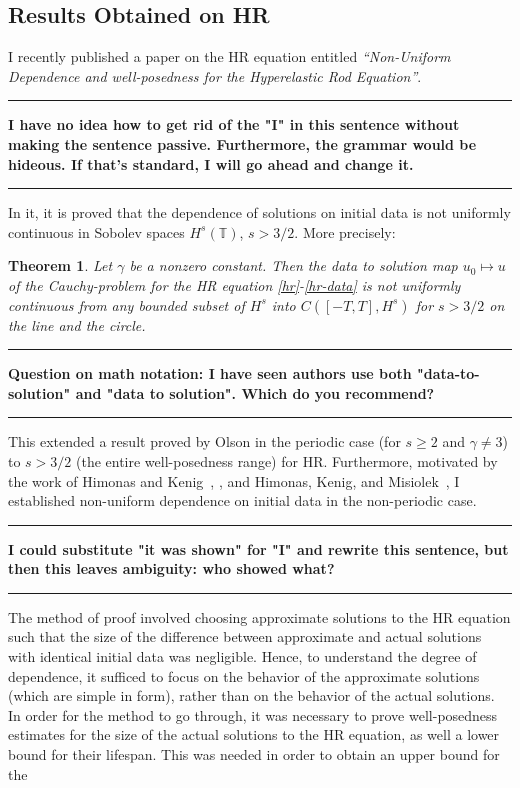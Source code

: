 \documentclass[12pt,reqno]{amsart}
\newcommand{\ci}{\mathbb{T}}
\newtheorem{theorem}{Theorem}
\begin{document}
\subsection{Results Obtained on HR} 
\label{ssec:weak-disp}
%
%
%
%
%
%
%
%
%
%
I recently published a paper on the HR equation entitled 
{\it ``Non-Uniform Dependence and well-posedness
for the
Hyperelastic Rod Equation''}. 
\hrule
\textbf{I have no idea how to get rid of the "I" in this sentence without making the sentence passive. Furthermore, the grammar would be hideous.
    If that's standard, I will go ahead and change it.}
\hrule
In it, it is proved that the dependence of
solutions on initial data is not uniformly continuous in Sobolev spaces
$H^s(\ci)$, $s>3/2$.  More precisely: 
\begin{theorem}
\label{hr-non-unif-dependence}
Let $\gamma$ be a nonzero constant. Then 
the data to solution map $u_{0} \mapsto u$ of the Cauchy-problem
for the HR equation
\eqref{hr}-\eqref{hr-data}
is not uniformly continuous
from any bounded subset of  $H^s$ into $C([-T, T], H^s)$
for $s>3/2$ on the line and the circle.
%
\end{theorem}
\hrule
\textbf{Question on math notation: I have seen authors use both "data-to-solution" and "data to solution". Which do you recommend?}
\hrule
This extended a result proved by Olson 
\cite{Olson_2006_Non-uniform-dep} in the periodic
case (for $s\ge 2$ and $\gamma \ne 3$)  to  $s>3/2$ (the entire well-posedness
range) for HR\@. Furthermore, motivated by the work of Himonas and
Kenig~\cite{Himonas:2009fk}, \cite{Himonas:2009fk}, and 
Himonas, Kenig, and Misiolek~\cite{Himonas_2009_Non-uniform-dep-per},
I established non-uniform dependence on initial data in the non-periodic case.
\hrule
\textbf{I could substitute "it was shown" for "I" and rewrite this sentence, but then this leaves ambiguity: who showed what?}
\hrule
The method of proof involved choosing approximate solutions to the HR equation
such that the size of the difference between approximate and actual solutions
with identical initial data was negligible. Hence, to understand the degree of
dependence, it sufficed to focus on the behavior of the approximate solutions
(which are simple in form), rather than on the behavior of the actual solutions.
In order for the method to go through, it was necessary to prove well-posedness estimates
for the size of the actual solutions to the HR equation, as well a lower bound
for their lifespan. This was needed in order to obtain an upper bound for the
\end{document}
